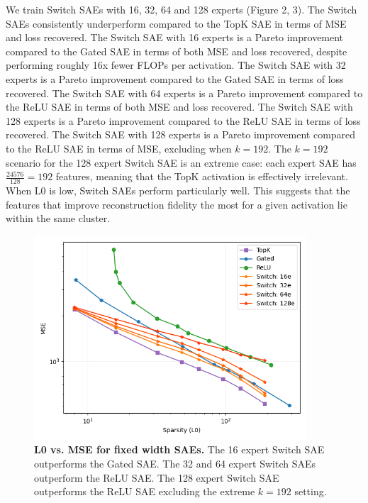 \documentclass{article} %
\begin{document}
We train Switch SAEs with 16, 32, 64 and 128 experts (Figure 2, 3). The Switch SAEs consistently underperform compared to the TopK SAE in terms of MSE and loss recovered. The Switch SAE with 16 experts is a Pareto improvement compared to the Gated SAE in terms of both MSE and loss recovered, despite performing roughly 16x fewer FLOPs per activation. The Switch SAE with 32 experts is a Pareto improvement compared to the Gated SAE in terms of loss recovered. The Switch SAE with 64 experts is a Pareto improvement compared to the ReLU SAE in terms of both MSE and loss recovered. The Switch SAE with 128 experts is a Pareto improvement compared to the ReLU SAE in terms of loss recovered. The Switch SAE with 128 experts is a Pareto improvement compared to the ReLU SAE in terms of MSE, excluding when $k = 192$. The $k = 192$ scenario for the 128 expert Switch SAE is an extreme case: each expert SAE has $\frac{24576}{128} = 192$ features, meaning that the TopK activation is effectively irrelevant. When L0 is low, Switch SAEs perform particularly well. This suggests that the features that improve reconstruction fidelity the most for a given activation lie within the same cluster.

\begin{figure}[h]
\begin{center}
\includegraphics[width=4in]{fig/l0_mse.png}
\end{center}
\caption{\textbf{L0 vs. MSE for fixed width SAEs.} The 16 expert Switch SAE outperforms the Gated SAE. The 32 and 64 expert Switch SAEs outperform the ReLU SAE. The 128 expert Switch SAE outperforms the ReLU SAE excluding the extreme $k = 192$ setting.}
\end{figure}
\end{document}

